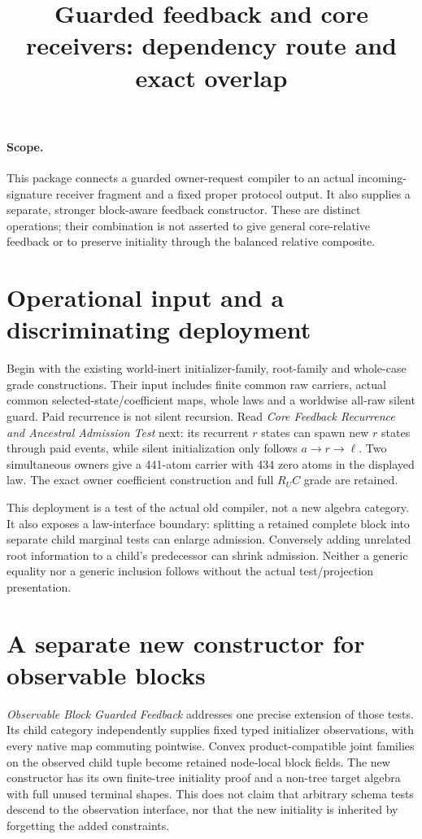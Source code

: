 \documentclass[11pt]{article}
\title{Guarded feedback and core receivers: dependency route and exact overlap}
\date{}
\begin{document}
\maketitle
\paragraph{Scope.} This package connects a guarded owner-request compiler to an actual incoming-signature receiver fragment and a fixed proper protocol output. It also supplies a separate, stronger block-aware feedback constructor. These are distinct operations; their combination is not asserted to give general core-relative feedback or to preserve initiality through the balanced relative composite.

\section{Operational input and a discriminating deployment}
Begin with the existing world-inert initializer-family, root-family and whole-case grade constructions. Their input includes finite common raw carriers, actual common selected-state/coefficient maps, whole laws and a worldwise all-raw silent guard. Paid recurrence is not silent recursion. Read \emph{Core Feedback Recurrence and Ancestral Admission Test} next: its recurrent $r$ states can spawn new $r$ states through paid events, while silent initialization only follows $a\to r\to\ell$. Two simultaneous owners give a 441-atom carrier with 434 zero atoms in the displayed law. The exact owner coefficient construction and full $R_U C$ grade are retained.

This deployment is a test of the actual old compiler, not a new algebra category. It also exposes a law-interface boundary: splitting a retained complete block into separate child marginal tests can enlarge admission. Conversely adding unrelated root information to a child's predecessor can shrink admission. Neither a generic equality nor a generic inclusion follows without the actual test/projection presentation.

\section{A separate new constructor for observable blocks}
\emph{Observable Block Guarded Feedback} addresses one precise extension of those tests. Its child category independently supplies fixed typed initializer observations, with every native map commuting pointwise. Convex product-compatible joint families on the observed child tuple become retained node-local block fields. The new constructor has its own finite-tree initiality proof and a non-tree target algebra with full unused terminal shapes. This does not claim that arbitrary schema tests descend to the observation interface, nor that the new initiality is inherited by forgetting the added constraints.
\end{document}
